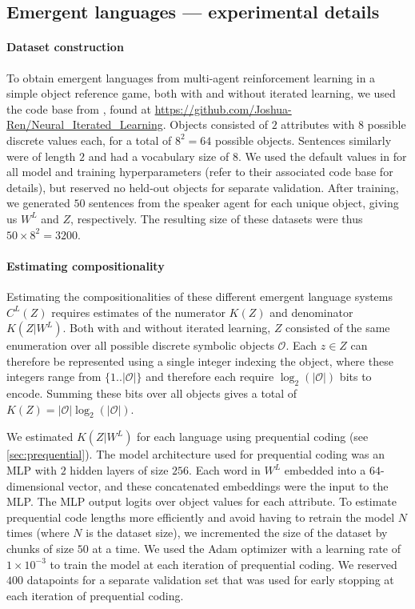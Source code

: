 \documentclass{article} %
\begin{document}
\begin{appendices}
\section{Emergent languages --- experimental details}
\label{sec:emergent_details}

\paragraph{Dataset construction}

To obtain emergent languages from multi-agent reinforcement learning in a simple object reference game, both with and without iterated learning, we used the code base from \citet{ren2020compositional}, found at \url{https://github.com/Joshua-Ren/Neural_Iterated_Learning}. Objects consisted of $2$ attributes with $8$ possible discrete values each, for a total of $8^2 = 64$ possible objects. Sentences similarly were of length $2$ and had a vocabulary size of $8$. We used the default values in \citet{ren2020compositional} for all model and training hyperparameters (refer to their associated code base for details), but reserved no held-out objects for separate validation. After training, we generated $50$ sentences from the speaker agent for each unique object, giving us $W^L$ and $Z$, respectively. The resulting size of these datasets were thus $50 \times 8^2 = 3200$.

\paragraph{Estimating compositionality}

Estimating the compositionalities of these different emergent language systems $C^L(Z)$ requires estimates of the numerator $K(Z)$ and denominator $K(Z|W^L)$. Both with and without iterated learning, $Z$ consisted of the same enumeration over all possible discrete symbolic objects $\mathcal{O}$. Each $z \in Z$ can therefore be represented using a single integer indexing the object, where these integers range from $\{1..|\mathcal{O}|\}$ and therefore each require $\log_2 (|\mathcal{O}|)$ bits to encode. Summing these bits over all objects gives a total of $K(Z) = |\mathcal{O}| \log_2 (|\mathcal{O}|)$.

We estimated $K(Z|W^L)$ for each language using prequential coding (see \cref{sec:prequential}). The model architecture used for prequential coding was an MLP with $2$ hidden layers of size $256$. Each word in $W^L$ embedded into a $64$-dimensional vector, and these concatenated embeddings were the input to the MLP. The MLP output logits over object values for each attribute. To estimate prequential code lengths more efficiently and avoid having to retrain the model $N$ times (where $N$ is the dataset size), we incremented the size of the dataset by chunks of size $50$ at a time. We used the Adam optimizer with a learning rate of $1 \times 10^{-3}$ to train the model at each iteration of prequential coding. We reserved $400$ datapoints for a separate validation set that was used for early stopping at each iteration of prequential coding.



\end{appendices}
\end{document}

